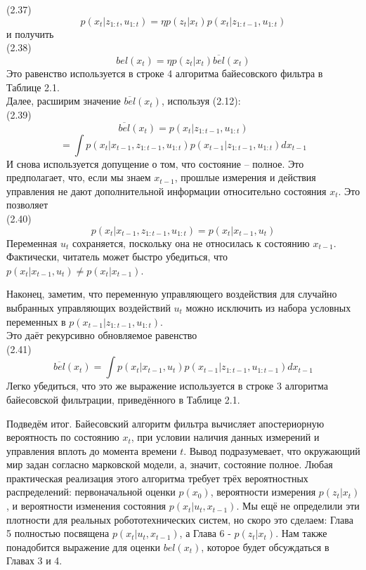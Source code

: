 \documentclass[10pt,a4paper]{article}
\begin{document}
 (2.37) $$p(x_t | z_{1:t}, u_{1:t}) = \eta p(z_t | x_t) p(x_t | z_{1:t-1}, u_{1:t})$$
 и получить\\
 
 (2.38) $$bel(x_t) = \eta p(z_t | x_t) \overline{bel}(x_t)$$
 Это равенство используется в строке 4 алгоритма байесовского фильтра в Таблице 2.1.\\
 Далее, расширим значение $\overline{bel}(x_t)$, используя (2.12):\\

 (2.39) $$\overline{bel}(x_t) = p(x_t | z_{1:t-1}, u_{1:t})$$
 $$= \int p(x_t | x_{t-1}, z_{1:t-1}, u_{1:t}) p(x_{t-1} | z_{1:t-1}, u_{1:t}) dx_{t-1}$$
 И снова используется допущение о том, что состояние – полное. Это предполагает, что, если мы знаем $x_{t-1}$, прошлые измерения и действия управления не дают дополнительной информации относительно состояния $x_t$. Это позволяет\\
 
 (2.40) $$p(x_t | x_{t-1}, z_{1:t-1}, u_{1:t}) = p(x_t | x_{t-1}, u_t)$$
   Переменная $u_t$ сохраняется, поскольку она не относилась к состоянию $x_{t-1}$.
 Фактически, читатель может быстро убедиться, что $p(x_t | x_{t-1}, u_t)\neq p(x_t | x_{t-1})$.
 
 Наконец, заметим, что переменную управляющего воздействия для случайно выбранных управляющих воздействий $u_t$ можно исключить из набора условных переменных в $p(x_{t-1} | z_{1:t-1}, u_{1:t})$.\\
 Это даёт рекурсивно обновляемое равенство\\
  
 (2.41) $$\overline{bel}(x_t) = \int p(x_t | x_{t-1}, u_t) p(x_{t-1} | z_{1:t-1}, u_{1:t-1}) dx_{t-1}$$
 Легко убедиться, что это же выражение используется в строке 3 алгоритма байесовской фильтрации, приведённого в Таблице 2.1.
 
 Подведём итог. Байесовский алгоритм фильтра вычисляет апостериорную вероятность по состоянию $x_t$, при условии наличия данных измерений и управления вплоть до момента времени $t$. Вывод подразумевает, что окружающий мир задан согласно марковской модели, а, значит, состояние полное.  Любая практическая реализация этого алгоритма требует трёх вероятностных распределений: первоначальной оценки $p(x_0)$, вероятности измерения $p(z_t | x_t)$, и вероятности изменения состояния $p(x_t | u_t, x_{t-1})$.
 Мы ещё не определили эти плотности для реальных робототехнических систем, но скоро это сделаем: Глава 5 полностью посвящена $p(x_t | u_t, x_{t-1})$, а Глава 6 - $p(z_t | x_t)$. Нам также понадобится выражение для оценки $bel(x_t)$, которое будет обсуждаться в Главах 3 и 4.\\
 
\end{document}
